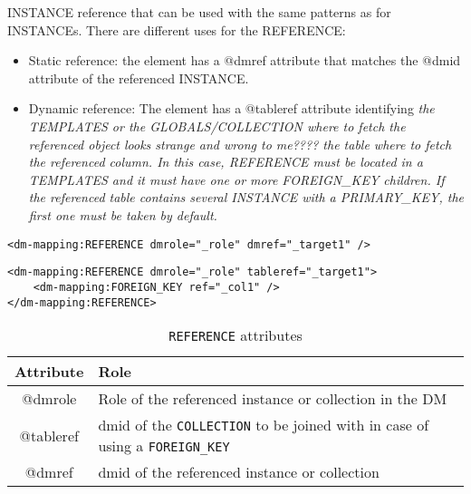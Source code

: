 INSTANCE reference that can be used with the same patterns as for INSTANCEs.
There are different uses for the REFERENCE:

\begin{itemize}
    \item Static reference: the element has a @dmref attribute that matches the @dmid attribute of the referenced INSTANCE.
    \item Dynamic reference: The element has a @tableref attribute identifying \it{the TEMPLATES or the GLOBALS/COLLECTION where to fetch the referenced object looks strange and wrong to me????} the table where to fetch the referenced column. 
             In this case, REFERENCE must be located in a TEMPLATES and it must have one or more FOREIGN\_KEY children. 
             If the referenced table contains several INSTANCE with a PRIMARY\_KEY, the first one must be taken by default.
\end{itemize}

\begin{lstlisting}[frame=single,caption={Simple \texttt{REFERENCE}, to be replaced with the INSTANCE having @dmid=\_target1 },style=XML,basicstyle=\tiny]
<dm-mapping:REFERENCE dmrole="_role" dmref="_target1" />
\end{lstlisting}

\begin{lstlisting}[frame=single,caption={Dynamic \texttt{REFERENCE}, to be replaced with the INSTANCE of the table of collection \_target1 and having a PRIMARY\_KEY matching the value of column  \_col1. This pattern is valid in the context of a TEMPLATES},style=XML,basicstyle=\tiny]
<dm-mapping:REFERENCE dmrole="_role" tableref="_target1">
    <dm-mapping:FOREIGN_KEY ref="_col1" />
</dm-mapping:REFERENCE>
\end{lstlisting}

\begin{table}[!htbp]
\small
\centering
\begin{tabulary}{\linewidth}{|c|J|}       
       \hline 
            \textbf{Attribute} & 
            \textbf {Role}\\
       \hline         \hline  
            @dmrole & 
            Role of the referenced instance or collection in the DM \\
        \hline 
            @tableref& 
            dmid of the \texttt{COLLECTION} to be joined with in case of using a \texttt{FOREIGN\_KEY} \\
        \hline 
            @dmref & 
            dmid of the referenced instance or collection\\
        \hline 
     \end{tabulary}
     \caption{\texttt{REFERENCE} attributes} 
     \label{tbl:reference-att}
 \end{table}

